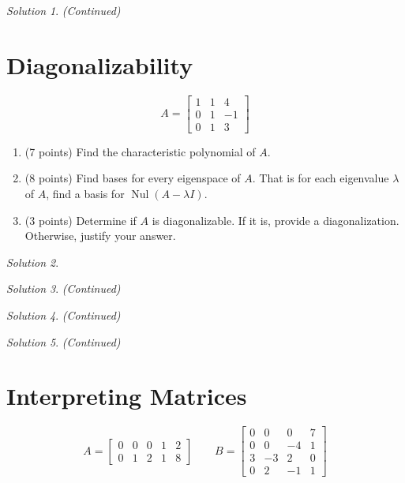 \documentclass{article}
\theoremstyle{remark} \newtheorem*{solution}{Solution}
\DeclareMathOperator{\nul}{Nul} \DeclareMathOperator{\rank}{rank}
\begin{document}
\pagebreak
\begin{solution}
  \textit{(Continued)}
\end{solution}

\pagebreak
\section{Diagonalizability}

\begin{displaymath}
  A =
  \begin{bmatrix}
    1 & 1 & 4 \\ 0 & 1 & -1 \\ 0 & 1 & 3
  \end{bmatrix}
\end{displaymath}

\begin{enumerate}
\item (7 points) Find the characteristic polynomial of $A$.
\item (8 points) Find bases for every eigenspace of $A$. That is for
  each eigenvalue $\lambda$ of $A$, find a basis for $\nul(A - \lambda
  I)$.
\item (3 points) Determine if $A$ is diagonalizable. If it is, provide
  a diagonalization. Otherwise, justify your answer.
\end{enumerate}

\medskip

\begin{solution}

\end{solution}

\pagebreak
\begin{solution}
  \textit{(Continued)}
\end{solution}

\pagebreak
\begin{solution}
  \textit{(Continued)}
\end{solution}

\pagebreak
\begin{solution}
  \textit{(Continued)}
\end{solution}

\pagebreak
\section{Interpreting Matrices}

\begin{displaymath}
  A =
  \begin{bmatrix}
    0 & 0 & 0 & 1 & 2 \\ 0 & 1 & 2 & 1 & 8
  \end{bmatrix}
  \qquad B =
  \begin{bmatrix}
    0 & 0 & 0 & 7 \\ 0 & 0 & -4 & 1 \\ 3 & -3 & 2 & 0 \\ 0 & 2 & -1 &
    1
  \end{bmatrix}
\end{displaymath}
\end{document}
